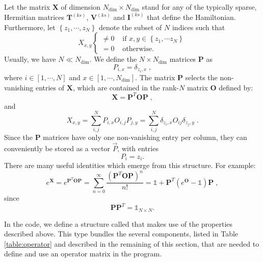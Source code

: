 Let the matrix $\bm{X}$ of dimension $N_{\mathrm{dim}} \times N_{\mathrm{dim}}$ stand for any of the typically sparse, Hermitian matrices $\bm{T}^{(ks)}$, $\bm{V}^{(ks)}$ and $\bm{I}^{(ks)}$ that define the Hamiltonian.
Furthermore, let $\left\{z_{1},\cdots, z_{N} \right\}$ denote the subset of $N$ indices such that
\begin{equation}
X_{x,y} 
\left\{\begin{matrix}  \neq 0  &  \text{ if }   x,  y  \in \left\{ z_1, \cdots z_N \right\}\\ 
                                 = 0         &  \text{ otherwise. } 
      \end{matrix}\right.
\end{equation}
Usually, we have $N\ll N_{\text{dim}}$.
 We define the $N \times N_{\mathrm{dim}}$ matrices $\bm{P}$  as
\begin{equation}
P_{i,x}=\delta_{z_{i},x}\;,
\end{equation}
where $i \in [1,\cdots, N ]$ and $ x  \in [1,\cdots, N_{\mathrm{dim}}]$. The matrix  $\bm{P}$ selects the non-vanishing entries of $\bm{X}$, 
which are contained in the rank-$N$  matrix $\bm{O}$ defined by:
\begin{equation}\label{eqn:xeqpdop}
\bm{X} =\bm{P}^{T} \bm{O} \bm{P}\;,
\end{equation}
and 
\begin{equation}
X_{x,y} = \sum\limits_{i,j}^{N}  P_{i,x}  O_{i,j} P_{j,y}=\sum\limits_{i,j}^{N} \delta_{z_{i},x}  O_{ij} \delta_{z_{j},y} \;.
\end{equation}
Since  the  $\bm{P}$ matrices have only one non-vanishing entry per column,  they can conveniently be stored as a vector $\vec{P}$, with entries
\begin{equation}
     P_i = z_i.
\end{equation}  
There are  many useful  identities which emerge from this  structure. For example: 
\begin{equation}
	e^{\bm{X}} =  e^{\bm{P}^{T} \bm{O} \bm{P}}   = \sum_{n=0}^{\infty}  \frac{\left( \bm{P}^{T} \bm{O} \bm{P} \right)^n}{n!} = \mathds{1}+ \bm{P}^{T} \left(e^{ \bm{O} }-\mathds{1} \right) \bm{P}\;,
\end{equation}
since 
\begin{equation} 
	 \bm{P} \bm{P}^{T}= \mathds{1}_{N\times N}.
\end{equation}

In the code, we define a structure called  that makes use of the properties described above. This type  bundles the several components, listed in Table \ref{table:operator} and described in the remaining of this section, that are needed to define and use an operator matrix in the program.  

